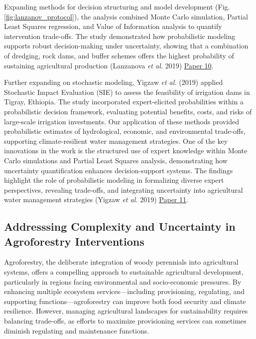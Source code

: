 \documentclass[
]{article}
\begin{document}
Expanding methods for decision structuring and model development (Fig.
\ref{fig:lanzanov_protocol}), the analysis combined Monte Carlo
simulation, Partial Least Squares regression, and Value of Information
analysis to quantify intervention trade-offs. The study demonstrated how
probabilistic modeling supports robust decision-making under
uncertainty, showing that a combination of dredging, rock dams, and
buffer schemes offers the highest probability of sustaining agricultural
production (Lanzanova \emph{et al.} 2019)
\protect\hyperlink{lanzanova_improving_2019}{Paper 10}.

Further expanding on stochastic modeling, Yigzaw \emph{et al.} (2019)
applied Stochastic Impact Evaluation (SIE) to assess the feasibility of
irrigation dams in Tigray, Ethiopia. The study incorporated
expert-elicited probabilities within a probabilistic decision framework,
evaluating potential benefits, costs, and risks of large-scale
irrigation investments. Our application of these methods provided
probabilistic estimates of hydrological, economic, and environmental
trade-offs, supporting climate-resilient water management strategies.
One of the key innovations in the work is the structured use of expert
knowledge within Monte Carlo simulations and Partial Least Squares
analysis, demonstrating how uncertainty quantification enhances
decision-support systems. The findings highlight the role of
probabilistic modeling in formalizing diverse expert perspectives,
revealing trade-offs, and integrating uncertainty into agricultural
water management strategies (Yigzaw \emph{et al.} 2019)
\protect\hyperlink{yigzaw_stochastic_2019}{Paper 11}.

\hypertarget{addresssing-complexity-and-uncertainty-in-agroforestry-interventions}{%
\subsection{Addresssing Complexity and Uncertainty in Agroforestry
Interventions}\label{addresssing-complexity-and-uncertainty-in-agroforestry-interventions}}

Agroforestry, the deliberate integration of woody perennials into
agricultural systems, offers a compelling approach to sustainable
agricultural development, particularly in regions facing environmental
and socio-economic pressures. By enhancing multiple ecosystem
services---including provisioning, regulating, and supporting
functions---agroforestry can improve both food security and climate
resilience. However, managing agricultural landscapes for sustainability
requires balancing trade-offs, as efforts to maximize provisioning
services can sometimes diminish regulating and maintenance functions.
\end{document}
